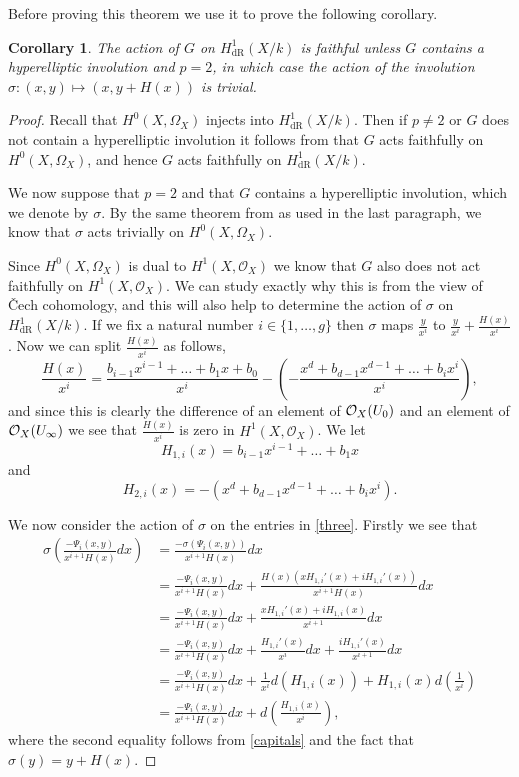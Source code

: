 \documentclass[draft, 11pt]{article} %
\theoremstyle{plain}
\newtheorem{cor}[defn]{Corollary}
\theoremstyle{remark}
\newcommand{\cO}{{\cal O}}
\newcommand{\cech}{\v{C}ech }
\newcommand{\hzero}{{H^0(X,\Omega_X)}}
\newcommand{\hone}{H^1(X,\mathcal{O}_X)}
\newcommand{\derhamhone}{H_{\text {dR}}^1(X/k)}
\begin{document}
Before proving this theorem we use it to prove the following corollary.

\begin{cor}
The action of $G$ on $\derhamhone$ is faithful unless $G$ contains a hyperelliptic involution and $p=2$, in which case the action of the involution $\sigma:(x,y) \mapsto (x,y+H(x))$ is trivial.
\end{cor}

\begin{proof}
Recall that $H^0(X,\Omega_X)$ injects into $\derhamhone$.
Then if $p \neq 2$ or $G$ does not contain a hyperelliptic involution it follows from \cite[Thm. 4.2]{faithfulaction} that $G$ acts faithfully on $H^0(X,\Omega_X)$, and hence $G$ acts faithfully on $\derhamhone$.

We now suppose that $p=2$ and that $G$ contains a hyperelliptic involution, which we denote by $\sigma$.
By the same theorem from \cite{faithfulaction} as used in the last paragraph, we know that $\sigma$ acts trivially on $\hzero$.

Since $\hzero$ is dual to $\hone$ we know that $G$ also does not act faithfully on $\hone$.
We can study exactly why this is from the view of \cech cohomology, and this will also help to determine the action of $\sigma$ on $\derhamhone$.
If we fix a natural number $i\in \{1, \ldots ,g\}$ then $\sigma$ maps $\frac{y}{x^i}$ to $\frac{y}{x^i} + \frac{H(x)}{x^i}$. 
Now we can split $\frac{H(x)}{x^i}$ as follows, 
\begin{equation*}
\frac{H(x)}{x^i} =  \frac{b_{i-1}x^{i-1} + \ldots + b_1x + b_0}{x^i} - \left( - \frac{x^d + b_{d-1}x^{d-1} + \ldots + b_ix^i}{x^i} \right),
\end{equation*}
and since this is clearly the difference of an element of $\cO_X(U_0)$ and an element of $\cO_X(U_\infty)$ we see that $\frac{H(x)}{x^i}$ is zero in $\hone$.
We let 
\[
H_{1,i}(x) = b_{i-1}x^{i-1} + \ldots + b_1x
\]
and 
\[
H_{2,i}(x) = -( x^d + b_{d-1}x^{d-1} + \ldots + b_ix^i).
\]

We now consider the action of $\sigma$ on the entries in \eqref{three}.
Firstly we see that
\begin{align*}
\sigma \left( \frac{-\Psi_i(x,y)}{x^{i+1}H(x)} dx\right) & = \frac{-\sigma(\Psi_i(x,y))}{x^{i+1} H(x)} dx \\
& = \frac{-\Psi_i(x,y)}{x^{i+1}H(x)}dx + \frac{H(x)(xH_{1,i}'(x) + iH_{1,i}'(x))}{x^{i+1}H(x)}dx\\
& = \frac{-\Psi_i(x,y)}{x^{i+1}H(x)}dx + \frac{xH_{1,i}'(x) + iH_{1,i}(x)}{x^{i+1}}dx \\
& = \frac{-\Psi_i(x,y)}{x^{i+1}H(x)}dx +  \frac{H_{1,i}'(x)}{x^i}dx + \frac{iH_{1,i}'(x)}{x^{i+1}}dx \\
& = \frac{-\Psi_i(x,y)}{x^{i+1}H(x)}dx +  \frac{1}{x^i}d\left( H_{1,i}(x) \right) + H_{1,i}(x) d \left( \frac{1}{x^i} \right) \\
& = \frac{-\Psi_i(x,y)}{x^{i+1}H(x)}dx + d\left( \frac{H_{1,i}(x)}{x^i} \right),
\end{align*}
where the second equality follows from \eqref{capitals} and the fact that $\sigma(y) = y + H(x)$.


\end{proof}
\end{document}
